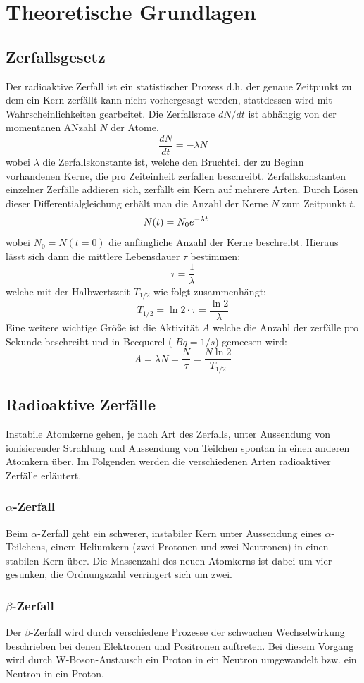 \documentclass[12pt]{article}
\begin{document}
\newpage
\section{Theoretische Grundlagen}
\subsection{Zerfallsgesetz}\label{zerfallsgesetz}
Der radioaktive Zerfall ist ein statistischer Prozess d.h. der genaue Zeitpunkt zu dem ein Kern zerfällt kann nicht vorhergesagt werden, stattdessen wird mit Wahrscheinlichkeiten gearbeitet. Die Zerfallsrate $dN/dt$ ist abhängig von der momentanen ANzahl $N$ der Atome.
\[\frac{dN}{dt}=-\lambda N\]
wobei $\lambda$ die Zerfallskonstante ist, welche den Bruchteil der zu Beginn vorhandenen Kerne, die pro Zeiteinheit zerfallen beschreibt. Zerfallskonstanten einzelner Zerfälle addieren sich, zerfällt ein Kern auf mehrere Arten. Durch Lösen dieser Differentialgleichung erhält man die Anzahl der Kerne $N$ zum Zeitpunkt $t$.
\[N(t)=N_0e^{-\lambda t}\hspace{0.5cm}\]
wobei $N_0=N(t=0)$ die anfängliche Anzahl der Kerne beschreibt. Hieraus lässt sich dann die mittlere Lebensdauer $\tau$ bestimmen:
\[\tau=\frac{1}{\lambda}\]
welche mit der Halbwertszeit $T_{1/2}$ wie folgt zusammenhängt:
\[T_{1/2} = \ln2\cdot \tau = \frac{\ln2}{\lambda}\]
Eine weitere wichtige Größe ist die Aktivität $A$ welche die Anzahl der zerfälle pro Sekunde beschreibt und in Becquerel ( $Bq=1/s$) gemeesen wird:
\[A = \lambda N = \frac{N}{\tau} = \frac{N\ln2}{T_{1/2}}\]
\subsection{Radioaktive Zerfälle}
Instabile Atomkerne gehen, je nach Art des Zerfalls, unter Aussendung von ionisierender Strahlung und Aussendung von Teilchen spontan in einen anderen Atomkern über. Im Folgenden werden die verschiedenen Arten radioaktiver Zerfälle erläutert.
\subsubsection{$\alpha$-Zerfall}
Beim $\alpha$-Zerfall geht ein schwerer, instabiler Kern unter Aussendung eines $\alpha$-Teilchens, einem Heliumkern (zwei Protonen und zwei Neutronen) in einen stabilen Kern über. Die Massenzahl des neuen Atomkerns ist dabei um vier gesunken, die Ordnungszahl verringert sich um zwei.
\subsubsection{$\beta$-Zerfall}
Der $\beta$-Zerfall wird durch verschiedene Prozesse der schwachen Wechselwirkung beschrieben bei denen Elektronen  und Positronen auftreten. Bei diesem Vorgang wird durch W-Boson-Austausch ein Proton in ein Neutron umgewandelt bzw. ein Neutron in ein Proton.
\end{document}
